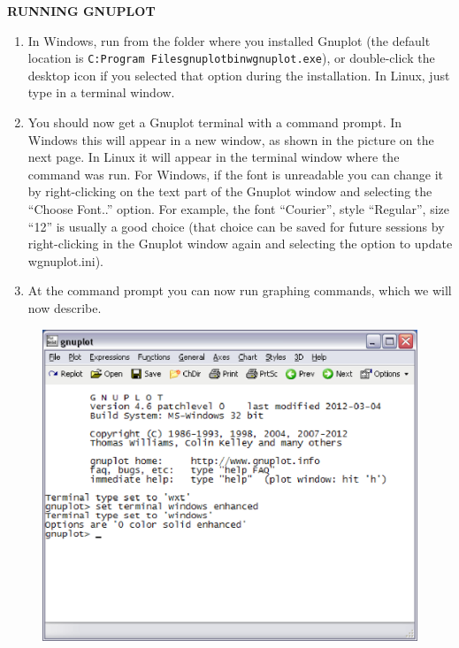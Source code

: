 \par\noindent\textbf{\textsf{RUNNING GNUPLOT}}
\begin{enumerate}
 \item In Windows, run \textbf{} from the  folder where you
  installed Gnuplot (the default location is
  \texttt{C:Program Filesgnuplotbinwgnuplot.exe}),
  or double-click the desktop icon if you selected that option during the installation.
  In Linux, just type \textbf{} in a terminal window.
 \item You should now get a Gnuplot terminal with a \textbf{} command prompt. In
  Windows this will appear in a new window, as shown in the picture on the next page.
  In Linux it will appear in the terminal window
  where the \textbf{} command was
  run. For Windows, if the font is unreadable you can change it by right-clicking on the text part
  of the Gnuplot window
  and selecting the ``Choose Font..'' option. For example, the font ``Courier'', style ``Regular'',
  size ``12'' is usually a
  good choice (that choice can be saved for future sessions by right-clicking in the Gnuplot window
  again and selecting the option to update wgnuplot.ini).
 \item At the \textbf{} command prompt you can now run graphing commands, which we
  will now describe.
\end{enumerate}
\newpage
\begin{figure}[h]
 \begin{center}
  \includegraphics{wgnuplot.eps}
 \end{center}
\end{figure}

